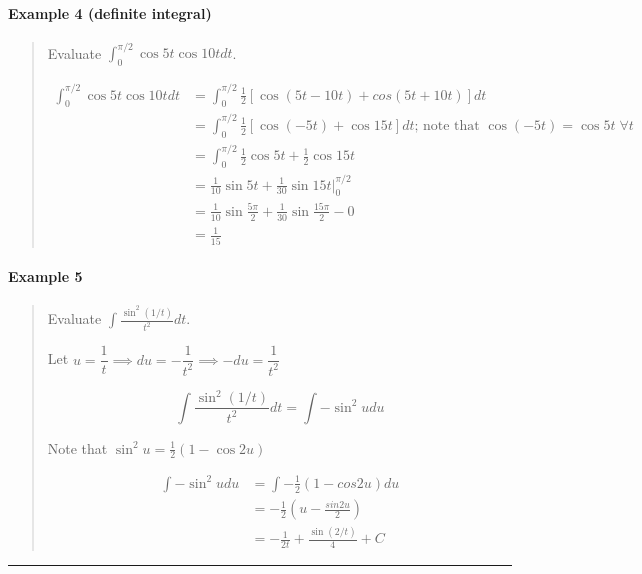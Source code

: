 \documentclass[
]{article}
\begin{document}
\hypertarget{example-4-definite-integral-1}{%
\paragraph*{Example 4 (definite
integral)}\label{example-4-definite-integral-1}}

\begin{quote}
Evaluate \(\displaystyle \int_0^{\pi/2} \cos 5t \cos 10t dt\).

\begin{align*}
\int_0^{\pi/2} \cos 5t \cos 10t dt &= \int_0^{\pi/2} \frac{1}{2} [\cos(5t-10t) + cos(5t+10t)]dt\\
&= \int_0^{\pi/2} \frac{1}{2} [\cos(-5t)+\cos 15t]dt \text{; note that } \cos(-5t) = \cos{5t} \;\forall t\\
&= \int_0^{\pi/2} \frac{1}{2} \cos 5t + \frac{1}{2}\cos 15t\\
&= \frac{1}{10}\sin 5t + \frac{1}{30} \sin 15t \Bigg|_0^{\pi/2}\\
&= \frac{1}{10}\sin {\frac{5\pi}{2}} + \frac{1}{30} \sin {\frac{15\pi}{2}} - 0\\
&= \frac{1}{15}
\end{align*}
\end{quote}

\hypertarget{example-5}{%
\paragraph*{Example 5}\label{example-5}}

\begin{quote}
Evaluate \(\displaystyle \int \frac{\sin^2(1/t)}{t^2}dt\).

Let
\(u = \dfrac{1}{t} \implies du = -\dfrac{1}{t^2} \implies -du = \dfrac{1}{t^2}\)

\[ \int \frac{\sin^2(1/t)}{t^2}dt = \int -\sin^2 u du \]

Note that \(\sin^2 u = \frac{1}{2}(1-\cos 2u)\)

\begin{align*}
\int -\sin^2 u du &= \int -\frac{1}{2}(1-cos2u)du\\
&= -\frac{1}{2}(u - \frac{sin 2u}{2})\\
&= -\frac{1}{2t} + \frac{\sin (2/t)}{4} + C
\end{align*}
\end{quote}

\begin{center}\rule{0.5\linewidth}{0.5pt}\end{center}
\end{document}

